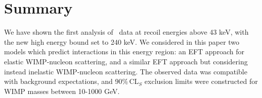 \section{Summary}
We have shown the first analysis of \Xehund\ data at recoil energies above 43 keV, with the new high energy bound set to 240 keV. We considered in this paper two models which predict interactions in this energy region: an EFT approach for elastic WIMP-nucleon scattering, and a similar EFT approach but considering instead inelastic WIMP-nucleon scattering. The observed data was compatible with background expectations, and 90\%\,CL$_S$ exclusion limits were constructed for WIMP masses between 10-1000 GeV.

